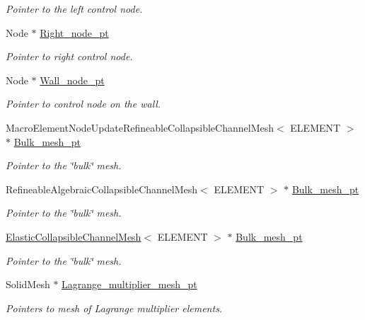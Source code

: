 \begin{DoxyCompactItemize}
\begin{DoxyCompactList}\small\item\em Pointer to the left control node. \end{DoxyCompactList}\item 
Node $\ast$ \hyperlink{classFSICollapsibleChannelProblem_a194e116e377045afba000fba80a46fa8}{Right\+\_\+node\+\_\+pt}
\begin{DoxyCompactList}\small\item\em Pointer to right control node. \end{DoxyCompactList}\item 
Node $\ast$ \hyperlink{classFSICollapsibleChannelProblem_ad840e3bf0ee356ac054d9bcab97471d9}{Wall\+\_\+node\+\_\+pt}
\begin{DoxyCompactList}\small\item\em Pointer to control node on the wall. \end{DoxyCompactList}\item 
Macro\+Element\+Node\+Update\+Refineable\+Collapsible\+Channel\+Mesh$<$ E\+L\+E\+M\+E\+NT $>$ $\ast$ \hyperlink{classFSICollapsibleChannelProblem_a211bcc5fb6076133f46d63bfd827dd3f}{Bulk\+\_\+mesh\+\_\+pt}
\begin{DoxyCompactList}\small\item\em Pointer to the \char`\"{}bulk\char`\"{} mesh. \end{DoxyCompactList}\item 
Refineable\+Algebraic\+Collapsible\+Channel\+Mesh$<$ E\+L\+E\+M\+E\+NT $>$ $\ast$ \hyperlink{classFSICollapsibleChannelProblem_aa0da71e3534daa79c0c4c2e6dbc6338c}{Bulk\+\_\+mesh\+\_\+pt}
\begin{DoxyCompactList}\small\item\em Pointer to the \char`\"{}bulk\char`\"{} mesh. \end{DoxyCompactList}\item 
\hyperlink{classElasticCollapsibleChannelMesh}{Elastic\+Collapsible\+Channel\+Mesh}$<$ E\+L\+E\+M\+E\+NT $>$ $\ast$ \hyperlink{classFSICollapsibleChannelProblem_a73b35b23f07b5f79e288064c2e62e1ac}{Bulk\+\_\+mesh\+\_\+pt}
\begin{DoxyCompactList}\small\item\em Pointer to the \char`\"{}bulk\char`\"{} mesh. \end{DoxyCompactList}\item 
Solid\+Mesh $\ast$ \hyperlink{classFSICollapsibleChannelProblem_a3a5aa5a00fbecec4bede0aee9af6b338}{Lagrange\+\_\+multiplier\+\_\+mesh\+\_\+pt}
\begin{DoxyCompactList}\small\item\em Pointers to mesh of Lagrange multiplier elements. \end{DoxyCompactList}\item 

\end{DoxyCompactItemize}
